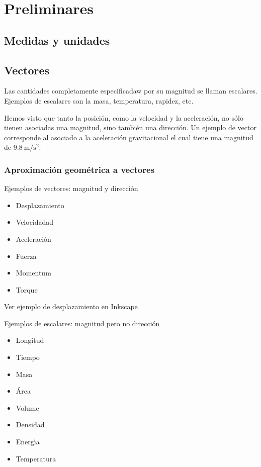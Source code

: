 \chapter{Preliminares}

\section{Medidas y unidades}



\section{Vectores}
\label{sec:vectores}

Las cantidades completamente especificadaw por su magnitud se llaman escalares. Ejemplos de escalares son la masa, temperatura, rapidez, etc.

Hemos visto que tanto la posici\'on, como la velocidad y la aceleraci\'on, no s\'olo tienen asociadas una magnitud, sino tambi\'en una direcci\'on. Un ejemplo de vector corresponde al asociado a la aceleraci\'on gravitacional el cual tiene una magnitud de $9.8\ \text{m}/\text{s}^2$.

\subsection{Aproximaci\'on geom\'etrica a vectores}

Ejemplos de vectores: magnitud y direcci\'on
\begin{itemize}
\item Desplazamiento
\item Velocidadad
\item Aceleraci\'on
\item Fuerza
\item Momentum
\item Torque
\end{itemize}
\begin{inprogress}
  Ver ejemplo de desplazamiento en Inkscape
\end{inprogress}


Ejemplos de escalares: magnitud pero no direcci\'on
\begin{itemize}
\item Longitud
\item Tiempo
\item Masa
\item \'Area
\item Volume
\item Densidad
\item Energ\'\i a
\item Temperatura
\end{itemize}

